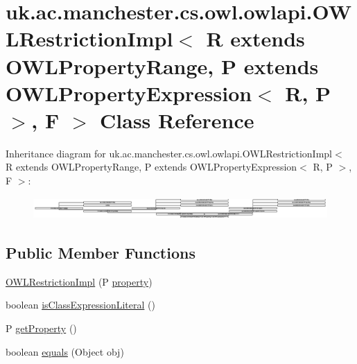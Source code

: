 \hypertarget{classuk_1_1ac_1_1manchester_1_1cs_1_1owl_1_1owlapi_1_1_o_w_l_restriction_impl_3_01_r_01extends_07a3269898cc55de4409f398a643a25a6}{\section{uk.\-ac.\-manchester.\-cs.\-owl.\-owlapi.\-O\-W\-L\-Restriction\-Impl$<$ R extends O\-W\-L\-Property\-Range, P extends O\-W\-L\-Property\-Expression$<$ R, P $>$, F $>$ Class Reference}
\label{classuk_1_1ac_1_1manchester_1_1cs_1_1owl_1_1owlapi_1_1_o_w_l_restriction_impl_3_01_r_01extends_07a3269898cc55de4409f398a643a25a6}
}
Inheritance diagram for uk.\-ac.\-manchester.\-cs.\-owl.\-owlapi.\-O\-W\-L\-Restriction\-Impl$<$ R extends O\-W\-L\-Property\-Range, P extends O\-W\-L\-Property\-Expression$<$ R, P $>$, F $>$\-:\begin{figure}[H]
\begin{center}
\leavevmode
\includegraphics[height=0.831213cm]{classuk_1_1ac_1_1manchester_1_1cs_1_1owl_1_1owlapi_1_1_o_w_l_restriction_impl_3_01_r_01extends_07a3269898cc55de4409f398a643a25a6}
\end{center}
\end{figure}
\subsection*{Public Member Functions}
\begin{DoxyCompactItemize}
\item 
\hyperlink{classuk_1_1ac_1_1manchester_1_1cs_1_1owl_1_1owlapi_1_1_o_w_l_restriction_impl_3_01_r_01extends_07a3269898cc55de4409f398a643a25a6_aa59fb7bfc389e7c21b88954dae36e54e}{O\-W\-L\-Restriction\-Impl} (P \hyperlink{classuk_1_1ac_1_1manchester_1_1cs_1_1owl_1_1owlapi_1_1_o_w_l_restriction_impl_3_01_r_01extends_07a3269898cc55de4409f398a643a25a6_a62a04c57a027c2dda62b2eba4b4ed614}{property})
\item 
boolean \hyperlink{classuk_1_1ac_1_1manchester_1_1cs_1_1owl_1_1owlapi_1_1_o_w_l_restriction_impl_3_01_r_01extends_07a3269898cc55de4409f398a643a25a6_a0c44c22dfa247d631d89ae89a38324d1}{is\-Class\-Expression\-Literal} ()
\item 
P \hyperlink{classuk_1_1ac_1_1manchester_1_1cs_1_1owl_1_1owlapi_1_1_o_w_l_restriction_impl_3_01_r_01extends_07a3269898cc55de4409f398a643a25a6_afee8e36ca68cc55039f0d79a1773bb5f}{get\-Property} ()
\item 
boolean \hyperlink{classuk_1_1ac_1_1manchester_1_1cs_1_1owl_1_1owlapi_1_1_o_w_l_restriction_impl_3_01_r_01extends_07a3269898cc55de4409f398a643a25a6_a9f4e748ab55ef9a39fc1459547d2f98f}{equals} (Object obj)
\end{DoxyCompactItemize}
